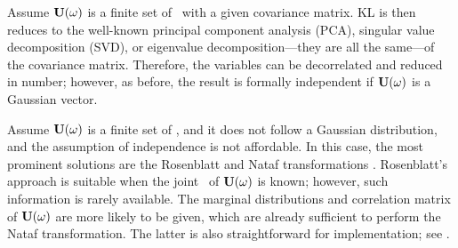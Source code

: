 Assume $\mathbf{U}(\omega)$ is a finite set of \rvs\ with a given covariance matrix. KL is then reduces to the well-known principal component analysis (PCA), singular value decomposition (SVD), or eigenvalue decomposition---they are all the same---of the covariance matrix. Therefore, the variables can be decorrelated and reduced in number; however, as before, the result is formally independent if $\mathbf{U}(\omega)$ is a Gaussian vector.

Assume $\mathbf{U}(\omega)$ is a finite set of \rvs, and it does not follow a Gaussian distribution, and the assumption of independence is not affordable. In this case, the most prominent solutions are the Rosenblatt and Nataf transformations \cite{eldred2009, li2008}. Rosenblatt's approach is suitable when the joint \pdf\ of $\mathbf{U}(\omega)$ is known; however, such information is rarely available. The marginal distributions and correlation matrix of $\mathbf{U}(\omega)$ are more likely to be given, which are already sufficient to perform the Nataf transformation. The latter is also straightforward for implementation; see \cite{li2008}.
